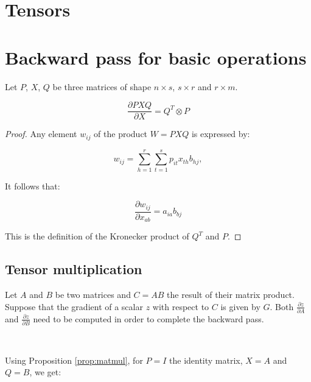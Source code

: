 



\section{Tensors}

\section{Backward pass for basic operations}

\begin{prop}
  \label{prop:matmul}
  Let $P$, $X$, $Q$ be three matrices of shape $n \times s$, $s \times r$ and
  $r \times m$. 

  \begin{equation}
    \frac{\partial PXQ}{\partial X} = Q^T \otimes P
  \end{equation}
\end{prop}

\begin{proof}
  Any element $w_{ij}$ of the product $W = PXQ$ is expressed
  by:

  \begin{equation}
    w_{ij} = \sum_{h=1}^{r} \sum_{t=1}^{s} p_{it} x_{th} b_{hj},
  \end{equation}
  
  It follows that:

  \begin{equation}
    \frac{\partial w_{ij}}{\partial x_{ab}} = a_{ia}b_{bj}
  \end{equation}

  This is the definition of the Kronecker product of $Q^T$ and $P$.
\end{proof}


\subsection{Tensor multiplication}

Let $A$ and $B$ be two matrices and $C = AB$ the result of their matrix
product. Suppose that the gradient of a scalar $z$ with respect to $C$ is given
by $G$. Both $\frac{\partial z}{\partial A}$ and $\frac{\partial z}{\partial
B}$ need to be computed in order to complete the backward pass.

\

Using Proposition \ref{prop:matmul}, for $P = I$ the identity matrix, $X = A$ and $Q = B$, we get:

